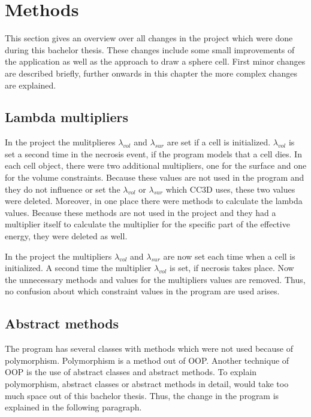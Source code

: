 \chapter{Methods}

    
    
This section gives an overview over all changes in the project which were done during this bachelor thesis. These changes include some small improvements of the application as well as the approach to draw a sphere cell. First minor changes are described briefly, further onwards in this chapter the more complex changes are explained. 

\section{Lambda multipliers} \label{sec:LambdaMultipliers}
In the project the mulitplieres $\lambda_{vol}$ and $\lambda_{sur}$ are set if a cell is initialized. $\lambda_{vol}$ is set a second time in the necrosis event, if the program models that a cell dies. \newline
In each cell object, there were two additional multipliers, one for the surface and one for the volume constraints. Because these values are not used in the program and they do not influence or set the $\lambda_{vol}$ or $\lambda_{sur}$ which \ac{CC3D} uses, these two values were deleted. Moreover, in one place there were methods to calculate the lambda values. Because these methods are not used in the project and they had a multiplier itself to calculate the multiplier for the specific part of the effective energy, they were deleted as well. 

In the project the multipliers $\lambda_{vol}$ and $\lambda_{sur}$ are now set each time when a cell is initialized. A second time the multiplier $\lambda_{vol}$ is set, if necrosis takes place. Now the unnecessary methods and values for the multipliers values are removed. Thus, no confusion about which constraint values in the program are used arises.

\section{Abstract methods}\label{sec:AbstractMethods}
The program has several classes with methods which were not used because of polymorphism. Polymorphism is a method out of \ac{OOP}. Another technique of \ac{OOP} is the use of abstract classes and abstract methods. To explain polymorphism, abstract classes or abstract methods in detail, would take too much space out of this bachelor thesis. Thus, the change in the program is explained in the following paragraph.

